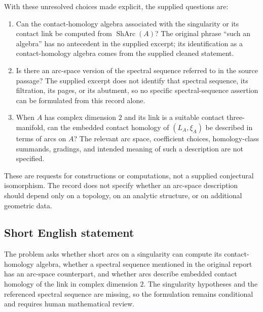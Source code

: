 \documentclass[11pt]{article}
\begin{document}
With these unresolved choices made explicit, the supplied questions are:
\begin{enumerate}
\item Can the contact-homology algebra associated with the singularity or its contact link be computed from \(\operatorname{ShArc}(A)\)? The original phrase ``such an algebra'' has no antecedent in the supplied excerpt; its identification as a contact-homology algebra comes from the supplied cleaned statement.
\item Is there an arc-space version of the spectral sequence referred to in the source passage? The supplied excerpt does not identify that spectral sequence, its filtration, its pages, or its abutment, so no specific spectral-sequence assertion can be formulated from this record alone.
\item When \(A\) has complex dimension \(2\) and its link is a suitable contact three-manifold, can the embedded contact homology of \((L_A,\xi_A)\) be described in terms of arcs on \(A\)? The relevant arc space, coefficient choices, homology-class summands, gradings, and intended meaning of such a description are not specified.
\end{enumerate}
These are requests for constructions or computations, not a supplied conjectural isomorphism. The record does not specify whether an arc-space description should depend only on a topology, on an analytic structure, or on additional geometric data.
\subsection{Short English statement}
The problem asks whether short arcs on a singularity can compute its contact-homology algebra, whether a spectral sequence mentioned in the original report has an arc-space counterpart, and whether arcs describe embedded contact homology of the link in complex dimension \(2\). The singularity hypotheses and the referenced spectral sequence are missing, so the formulation remains conditional and requires human mathematical review.
\end{document}
